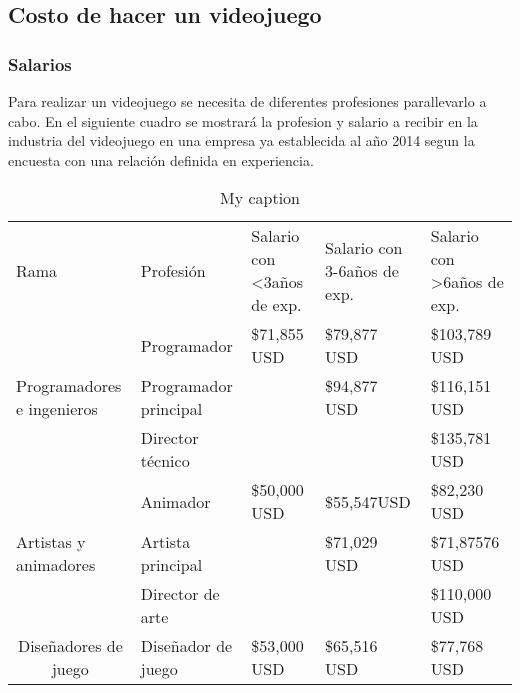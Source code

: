 \subsection{Costo de hacer un videojuego}\label{costoVJ}

	
\subsubsection{Salarios}
Para realizar un videojuego se necesita de diferentes profesiones parallevarlo a cabo.
En el siguiente cuadro se mostrará la profesion y salario a recibir en la industria del videojuego en una empresa ya establecida al año 2014 segun la encuesta con una relación definida en experiencia.

\begin{table}[]
	\centering
	\caption{My caption}
	\label{my-label}
	\begin{tabular}{lllll}
		Rama                                                      & Profesión                   & Salario con \textless 3años de exp. & Salario con 3-6años de exp. & Salario con \textgreater 6años de exp. \\
		\multirow{3}{*}{Programadores e ingenieros}               & Programador                 & \$71,855 USD                        & \$79,877 USD                & \$103,789 USD                          \\
		& Programador principal       &                                     & \$94,877 USD                & \$116,151 USD                          \\
		& Director técnico            &                                     &                             & \$135,781 USD                          \\
		\multirow{3}{*}{Artistas y animadores}                    & Animador                    & \$50,000 USD                        & \$55,547USD                 & \$82,230 USD                           \\
		& Artista principal           &                                     & \$71,029 USD                & \$71,87576 USD                         \\
		& Director de arte            &                                     &                             & \$110,000 USD                          \\
		\multicolumn{1}{c}{\multirow{2}{*}{Diseñadores de juego}} & Diseñador de juego          & \$53,000 USD                        & \$65,516 USD                & \$77,768 USD                           \\

\end{tabular}
\end{table}
